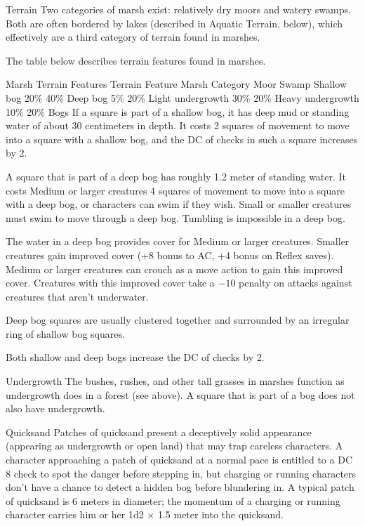 \Marsh Terrain
Two categories of marsh exist: relatively dry moors and watery swamps. Both are often bordered by lakes (described in Aquatic Terrain, below), which effectively are a third category of terrain found in marshes.

The table below describes terrain features found in marshes.

Marsh Terrain Features
Terrain Feature	Marsh Category
Moor	Swamp
Shallow bog	20\%	40\%
Deep bog	5\%	20\%
Light undergrowth	30\%	20\%
Heavy undergrowth	10\%	20\%
Bogs
If a square is part of a shallow bog, it has deep mud or standing water of about 30 centimeters in depth. It costs 2 squares of movement to move into a square with a shallow bog, and the DC of  checks in such a square increases by 2.

A square that is part of a deep bog has roughly 1.2 meter of standing water. It costs Medium or larger creatures 4 squares of movement to move into a square with a deep bog, or characters can swim if they wish. Small or smaller creatures must swim to move through a deep bog. Tumbling is impossible in a deep bog.

The water in a deep bog provides cover for Medium or larger creatures. Smaller creatures gain improved cover (+8 bonus to AC, +4 bonus on Reflex saves). Medium or larger creatures can crouch as a move action to gain this improved cover. Creatures with this improved cover take a $-10$ penalty on attacks against creatures that aren't underwater.

Deep bog squares are usually clustered together and surrounded by an irregular ring of shallow bog squares.

Both shallow and deep bogs increase the DC of  checks by 2.

Undergrowth
The bushes, rushes, and other tall grasses in marshes function as undergrowth does in a forest (see above). A square that is part of a bog does not also have undergrowth.

Quicksand
Patches of quicksand present a deceptively solid appearance (appearing as undergrowth or open land) that may trap careless characters. A character approaching a patch of quicksand at a normal pace is entitled to a DC 8  check to spot the danger before stepping in, but charging or running characters don't have a chance to detect a hidden bog before blundering in. A typical patch of quicksand is 6 meters in diameter; the momentum of a charging or running character carries him or her 1d2 $\times$ 1.5 meter into the quicksand.

